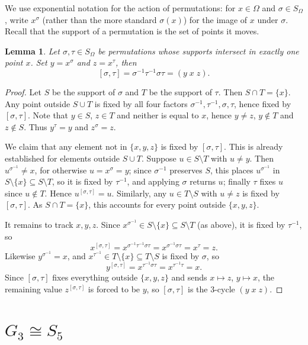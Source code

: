\documentclass[11pt]{article}
\newtheorem{lemma}{Lemma}
\begin{document}
We use exponential notation for the action of permutations: for $x \in \Omega$ and $\sigma \in S_\Omega$, write $x^\sigma$ (rather than the more standard $\sigma(x)$) for the image of $x$ under $\sigma$. Recall that the support of a permutation is the set of points it moves.

\begin{lemma}\label{lem:onepoint}
Let $\sigma,\tau \in S_\Omega$ be permutations whose supports intersect in exactly one point $x$. Set $y = x^\sigma$ and $z = x^\tau$, then
\[
[\sigma,\tau] = \sigma^{-1}\tau^{-1}\sigma\tau = (y\; x\; z).
\]
\end{lemma}
\begin{proof}
Let $S$ be the support of $\sigma$ and $T$ be the support of $\tau$. Then $S \cap T = \{x\}$. Any point outside $S \cup T$ is fixed by all four factors $\sigma^{-1},\tau^{-1},\sigma,\tau$, hence fixed by $[\sigma,\tau]$. Note that $y \in S$, $z\in T$ and neither is equal to $x$, hence $y \neq z$, $y \notin T$ and $z \notin S$. Thus $y^\tau = y$ and $z^\sigma = z$.

We claim that any element not in $\{x,y,z\}$ is fixed by $[\sigma,\tau]$. This is already established for elements outside $S\cup T$. Suppose $u \in S\setminus T$ with $u \neq y$. Then $u^{\sigma^{-1}} \neq x$, for otherwise $u = x^\sigma = y$; since $\sigma^{-1}$ preserves $S$, this places $u^{\sigma^{-1}}$ in $S\setminus\{x\} \subseteq S\setminus T$, so it is fixed by $\tau^{-1}$, and applying $\sigma$ returns $u$; finally $\tau$ fixes $u$ since $u \notin T$. Hence $u^{[\sigma,\tau]}=u$. Similarly, any $u \in T\setminus S$ with $u\neq z$ is fixed by $[\sigma,\tau]$. As $S \cap T = \{x\}$, this accounts for every point outside $\{x,y,z\}$.

It remains to track $x,y,z$. Since $x^{\sigma^{-1}} \in S\setminus\{x\} \subseteq S\setminus T$ (as above), it is fixed by $\tau^{-1}$, so
\[
x^{[\sigma,\tau]} = x^{\sigma^{-1}\tau^{-1}\sigma\tau} = x^{\sigma^{-1}\sigma\tau} = x^\tau = z.
\]
Likewise $y^{\sigma^{-1}} = x$, and $x^{\tau^{-1}} \in T\setminus\{x\} \subseteq T\setminus S$ is fixed by $\sigma$, so
\[
y^{[\sigma,\tau]} = x^{\tau^{-1}\sigma\tau} = x^{\tau^{-1}\tau} = x.
\]
Since $[\sigma,\tau]$ fixes everything outside $\{x,y,z\}$ and sends $x\mapsto z$, $y\mapsto x$, the remaining value $z^{[\sigma,\tau]}$ is forced to be $y$, so $[\sigma,\tau]$ is the $3$-cycle $(y\;x\;z)$.
\end{proof}

\section{$G_3 \cong S_5$}\label{app:g3iso}
\end{document}
